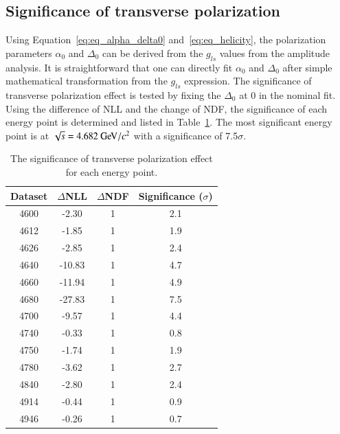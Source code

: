 \subsection{Significance of transverse polarization}
\label{sec:polar_significance}
Using Equation~\ref{eq:eq_alpha_delta0} and~\ref{eq:eq_helicity}, the polarization parameters $\alpha_0$ and $\Delta_0$ can be derived from the $g_{ls}$ values from the amplitude analysis. It is straightforward that one can directly fit $\alpha_0$ and $\Delta_0$ after simple mathematical transformation from the $g_{ls}$ expression. The significance of transverse polarization effect is tested by fixing the $\Delta_0$ at 0 in the nominal fit. Using the difference of NLL and the change of NDF, the significance of each energy point is determined and listed in Table~\ref{tab:delta0_significance}. The most significant energy point is at $\sqrt{s} = 4.682\gevcc$ with a significance of 7.5$\sigma$. 

\begin{table}[h]
    \centering
    \caption{The significance of transverse polarization effect for each energy point.}
    \label{tab:delta0_significance}
    \begin{tabular}{cccc}
        \hline\hline
    Dataset  & $\Delta$NLL &$\Delta$NDF  & Significance ($\sigma$) \\\hline
    4600 & -2.30 & 1 & 2.1\\
    4612 & -1.85 & 1 & 1.9\\
    4626 & -2.85 & 1 & 2.4\\
    4640 & -10.83 & 1 & 4.7\\
    4660 & -11.94 & 1 & 4.9\\
    4680 & -27.83 & 1 & 7.5\\
    4700 & -9.57 & 1 & 4.4\\
    4740 & -0.33 & 1 & 0.8\\
    4750 & -1.74 & 1 & 1.9\\
    4780 & -3.62 & 1 & 2.7\\
    4840 & -2.80 & 1 & 2.4\\
    4914 & -0.44 & 1 & 0.9\\
    4946 & -0.26 & 1 & 0.7\\
    \hline\hline
    \end{tabular}
\end{table}


\clearpage
